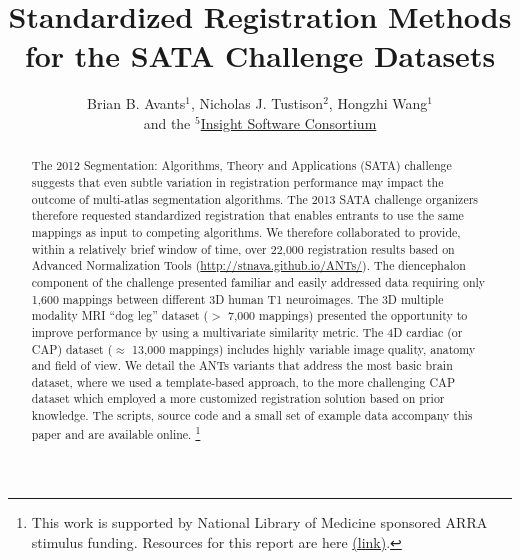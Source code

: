 \documentclass{llncs}
\begin{document}
\vspace{-0.1in}
\title{Standardized Registration Methods for the SATA Challenge Datasets}
\author{Brian B. Avants$^1$, Nicholas J. Tustison$^2$, Hongzhi
  Wang$^1$ \\and the
  $^5$\href{http://www.insightsoftwareconsortium.org/}{Insight
    Software Consortium}}
\maketitle              
\begin{abstract}
The 2012 Segmentation: Algorithms, Theory and Applications (SATA)
challenge suggests that even subtle variation in registration
performance may impact the outcome of multi-atlas segmentation
algorithms. The 2013 SATA challenge organizers therefore requested
standardized registration that enables entrants to use the same
mappings as input to competing algorithms.  We therefore collaborated
to provide, within a relatively brief window of time, over 22,000
registration results based on Advanced Normalization Tools
(\url{http://stnava.github.io/ANTs/}).
The diencephalon component of the challenge presented familiar and
easily addressed data requiring only 1,600 mappings between different
3D human T1 neuroimages.  The 3D multiple modality MRI ``dog leg'' dataset ($>$ 7,000
mappings) presented the opportunity to improve performance by using
a multivariate similarity metric.  The 4D cardiac (or CAP) dataset
($\approx$ 13,000 mappings) includes highly variable image quality, anatomy
and field of view.  We detail the ANTs variants that address the most basic brain dataset, where we used
a template-based approach, to the more challenging CAP dataset which
employed a more customized registration solution based on prior
knowledge.  The scripts, source code and a small set of example data
accompany this paper and are available online.  
\footnote{This work is supported by National Library of Medicine sponsored ARRA stimulus
funding. Resources for this report are here \href{https://github.com/stnava/KnobSock}{(link)}.}
\end{abstract}
\end{document}
